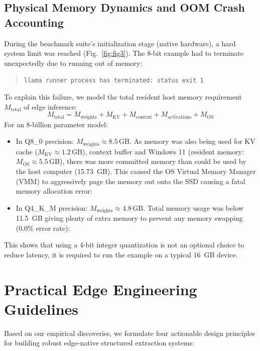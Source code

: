 \documentclass[conference]{IEEEtran}
\begin{document}
{\subsection{Physical Memory Dynamics and OOM Crash Accounting}
During the benchmark suite's initialization stage (native hardware), a hard system limit was reached (Fig.~\ref{fig:fig3}). The 8-bit example had to terminate unexpectedly due to running out of memory:
\begin{quote}
\texttt{llama runner process has terminated: status exit 1}
\end{quote}
To explain this failure, we model the total resident host memory requirement $M_{\text{total}}$ of edge inference:
\begin{equation}
M_{\text{total}} = M_{\text{weights}} + M_{\text{KV}} + M_{\text{context}} + M_{\text{activations}} + M_{\text{OS}}
\label{eq:memory}
\end{equation}
For an 8-billion parameter model:
\begin{itemize}
    \item In Q8\_0 precision: $M_{\text{weights}} \approx 8.5$\,GB. As memory was also being used for KV cache ($M_{\text{KV}} \approx 1.2$\,GB), context buffer and Windows 11 (resident memory: $M_{\text{OS}} \approx 5.5$\,GB), there was more committed memory than could be used by the host computer (15.73~GB). This caused the OS Virtual Memory Manager (VMM) to aggressively page the memory out onto the SSD causing a fatal memory allocation error:
    \item In Q4\_K\_M precision: $M_{\text{weights}} \approx 4.8$\,GB. Total memory usage was below 11.5~GB giving plenty of extra memory to prevent any memory swapping (0.0\% error rate):
\end{itemize}

This shows that using a 4-bit integer quantization is not an optional choice to reduce latency, it is required to run the example on a typical 16~GB device.
\section{Practical Edge Engineering Guidelines}
\label{sec:guidelines}

Based on our empirical discoveries, we formulate four actionable design principles for building robust edge-native structured extraction systems:

}
\end{document}
